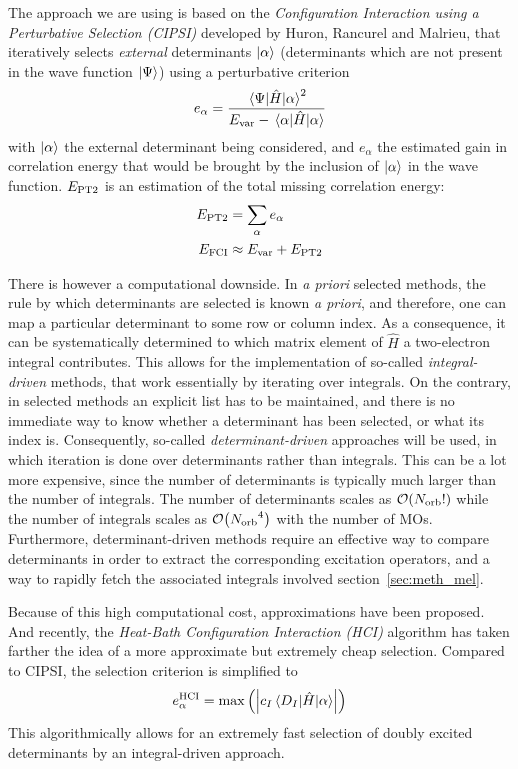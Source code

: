 \documentclass[./thesis.tex]{subfiles}
\begin{document}
The approach we are using is based on the \emph{Configuration Interaction using a Perturbative Selection (CIPSI)} developed by Huron, Rancurel and Malrieu,\cite{Huron_1973} that iteratively selects \emph{external} determinants ${\ket{\alpha}}$ (determinants which are not present in the wave function $\ket \Psi$) using a perturbative criterion
\begin{equation}
e_\alpha = \frac{\mel{\Psi}{\hat{H}}{\alpha}^2}{E_\text{var} - \mel{\alpha}{\hat{H}}{\alpha}}
\end{equation}
with $\ket \alpha$ the external determinant being considered, and $e_\alpha$ the estimated gain in correlation energy that would be brought by the inclusion of $\ket \alpha$ in the wave function. $E_\text{PT2}$ is an estimation of the total missing correlation energy:
\begin{align}
E_\text{PT2} & = \sum_{\alpha} e_\alpha \\
E_\text{FCI} & \approx E_\text{var} + E_\text{PT2}
\end{align}

There is however a computational downside. In \textit{a priori} selected methods, the rule by which determinants are selected is known \textit{a priori}, and therefore, one can map a particular determinant to some row or column index.\cite{Knowles_1984} As a consequence, it can be systematically determined to which matrix element of $\widehat{H}$ a two-electron integral contributes. This allows for the implementation of so-called \emph{integral-driven} methods, that work essentially by iterating over integrals.
On the contrary, in selected methods an explicit list has to be maintained, and there is no immediate way to know whether a determinant has been selected, or what its index is. Consequently, so-called \emph{determinant-driven} approaches will be used, in which iteration is done over determinants rather than integrals. This can be a lot more expensive, since the number of determinants is typically much larger than the number of integrals. The number of determinants scales as $\order{\Norb!}$ while the number of integrals scales as $\order{\Norb^4}$ with the number of MOs.
Furthermore, determinant-driven methods require an effective way to compare determinants in order to extract the corresponding excitation operators, and a way to rapidly fetch the associated integrals involved section~\ref{sec:meth_mel}.

Because of this high computational cost, approximations have been proposed.\cite{Evangelisti_1983} And recently, the \emph{Heat-Bath Configuration Interaction (HCI)} algorithm has taken farther the idea of a more approximate but extremely cheap selection.\cite{Holmes_2016, Sharma_2017} Compared to CIPSI, the selection criterion is simplified to
\begin{equation}
e^{\text{HCI}}_\alpha = \max \qty( \qty| c_I \mel{D_I}{\hat{H}}{\alpha} | )
\end{equation}
This algorithmically allows for an extremely fast selection of doubly
excited determinants by an integral-driven approach.
\end{document}
